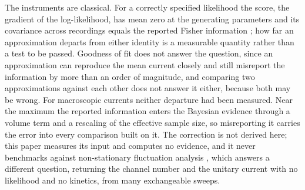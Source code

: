 The instruments are classical. For a correctly specified likelihood the score, the gradient of
the log-likelihood, has mean zero at the generating parameters and its covariance across recordings
equals the reported Fisher information \citep{huber1967behavior,white1982maximum}; how far an
approximation departs from either identity is a measurable quantity rather than a test to be passed.
Goodness of fit does not answer the question,
since an approximation can reproduce the mean current closely and still misreport the information by
more than an order of magnitude, and comparing two approximations against each other does not answer
it either, because both may be wrong. For macroscopic currents neither departure had been measured.
Near the maximum the reported information enters the Bayesian evidence
through a volume term and a rescaling of the effective sample size, so misreporting it carries the
error into every comparison built on it. The correction is not derived here; this
paper measures its input and computes no evidence,
 and it never benchmarks against non-stationary
fluctuation analysis \citep{stepanyuk2014maximum}, which answers a different question, returning the
channel number and the unitary current with no likelihood and no kinetics, from many exchangeable
sweeps.
